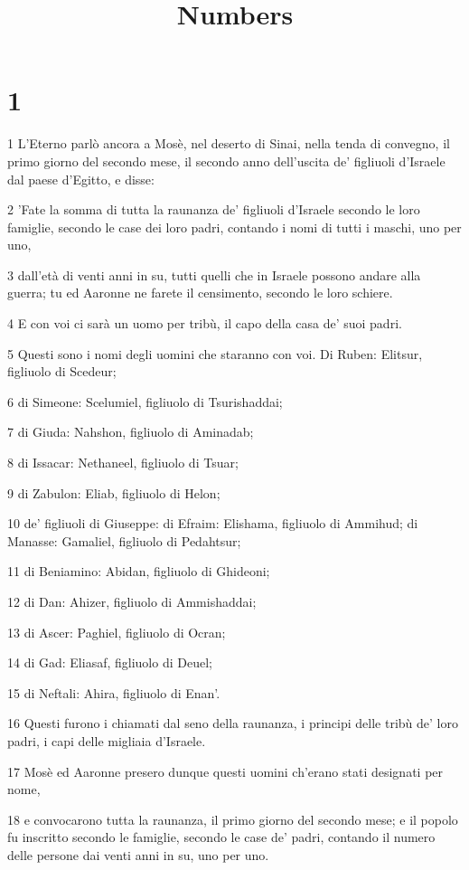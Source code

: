 

\title{Numbers}


\chapter{1}

\par 1 L'Eterno parlò ancora a Mosè, nel deserto di Sinai, nella tenda di convegno, il primo giorno del secondo mese, il secondo anno dell'uscita de' figliuoli d'Israele dal paese d'Egitto, e disse:
\par 2 'Fate la somma di tutta la raunanza de' figliuoli d'Israele secondo le loro famiglie, secondo le case dei loro padri, contando i nomi di tutti i maschi, uno per uno,
\par 3 dall'età di venti anni in su, tutti quelli che in Israele possono andare alla guerra; tu ed Aaronne ne farete il censimento, secondo le loro schiere.
\par 4 E con voi ci sarà un uomo per tribù, il capo della casa de' suoi padri.
\par 5 Questi sono i nomi degli uomini che staranno con voi. Di Ruben: Elitsur, figliuolo di Scedeur;
\par 6 di Simeone: Scelumiel, figliuolo di Tsurishaddai;
\par 7 di Giuda: Nahshon, figliuolo di Aminadab;
\par 8 di Issacar: Nethaneel, figliuolo di Tsuar;
\par 9 di Zabulon: Eliab, figliuolo di Helon;
\par 10 de' figliuoli di Giuseppe: di Efraim: Elishama, figliuolo di Ammihud; di Manasse: Gamaliel, figliuolo di Pedahtsur;
\par 11 di Beniamino: Abidan, figliuolo di Ghideoni;
\par 12 di Dan: Ahizer, figliuolo di Ammishaddai;
\par 13 di Ascer: Paghiel, figliuolo di Ocran;
\par 14 di Gad: Eliasaf, figliuolo di Deuel;
\par 15 di Neftali: Ahira, figliuolo di Enan'.
\par 16 Questi furono i chiamati dal seno della raunanza, i principi delle tribù de' loro padri, i capi delle migliaia d'Israele.
\par 17 Mosè ed Aaronne presero dunque questi uomini ch'erano stati designati per nome,
\par 18 e convocarono tutta la raunanza, il primo giorno del secondo mese; e il popolo fu inscritto secondo le famiglie, secondo le case de' padri, contando il numero delle persone dai venti anni in su, uno per uno.

